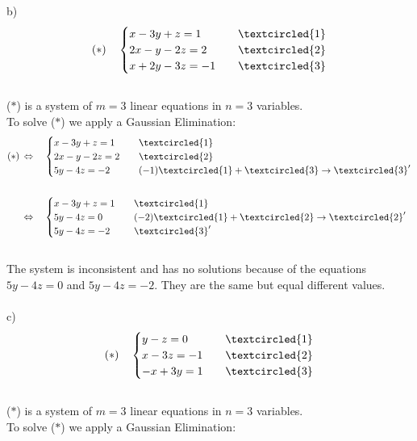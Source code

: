 \documentclass{jhwhw}
\begin{document}
b) \begin{align*} 
(\ast) \quad \begin{cases} x-3y+z=1 & \quad \textcircled{1} \\ 2x-y-2z=2 & \quad \textcircled{2} \\ x+2y-3z=-1 & \quad \textcircled{3} \end{cases}
\end{align*}
\\
(\(\ast\)) is a system of \(m=3\) linear equations in \(n=3\) variables. 
\\
To solve (\(\ast\)) we apply a Gaussian Elimination:
\\

\begin{align*} 
(\ast) \, &\Leftrightarrow \quad \begin{cases} x-3y+z=1 & \quad \textcircled{1}\\2x-y-2z=2 & \quad \textcircled{2} \\ 5y-4z=-2 & \quad (-1)\textcircled{1}+\textcircled{3} \rightarrow \textcircled{3}'  \end{cases}
\\ \\ 
&\Leftrightarrow \quad \begin{cases} x-3y+z=1 & \quad \textcircled{1} \\ 5y-4z=0 & \quad (-2)\textcircled{1}+\textcircled{2} \rightarrow \textcircled{2}' \\ 5y-4z=-2 & \quad \textcircled{3}' \end{cases}
\end{align*}
\\
The system is inconsistent and has no solutions because of the equations \(5y-4z=0\) and \(5y-4z=-2\). They are the same but equal different values.
\\ \\

c) \begin{align*} 
(\ast) \quad \begin{cases} y-z=0 & \quad \textcircled{1} \\ x-3z=-1 & \quad \textcircled{2} \\ -x+3y=1 & \quad \textcircled{3} \end{cases}
\end{align*}
\\
(\(\ast\)) is a system of \(m=3\) linear equations in \(n=3\) variables. 
\\
To solve (\(\ast\)) we apply a Gaussian Elimination:
\\
\end{document}
